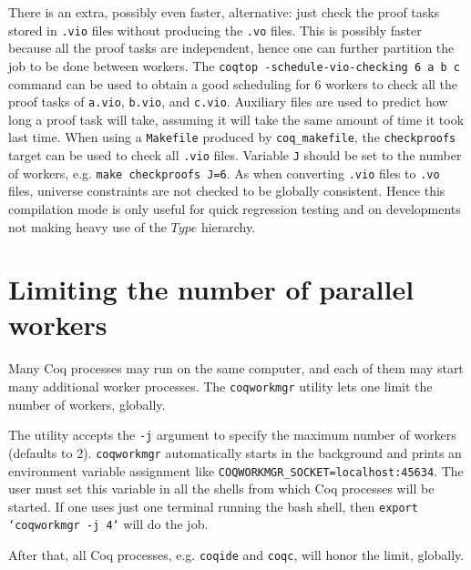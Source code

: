 There is an extra, possibly even faster, alternative: just check the
proof tasks stored in \texttt{.vio} files without producing the
\texttt{.vo} files. This is possibly faster because all the proof tasks
are independent, hence one can further partition the job to be done
between workers. The \texttt{coqtop -schedule-vio-checking 6 a b c}
command can be used to obtain a good scheduling for 6 workers to check
all the proof tasks of \texttt{a.vio}, \texttt{b.vio}, and
\texttt{c.vio}. Auxiliary files are used to predict how long a proof task
will take, assuming it will take the same amount of time it took last
time. When using a \texttt{Makefile} produced by \texttt{coq\_makefile},
the \texttt{checkproofs} target can be used to check all \texttt{.vio}
files. Variable \texttt{J} should be set to the number of workers,
e.g. \texttt{make checkproofs J=6}. As when converting \texttt{.vio}
files to \texttt{.vo} files, universe constraints are not checked to be
globally consistent. Hence this compilation mode is only useful for quick
regression testing and on developments not making heavy use of the $Type$
hierarchy.

\section{Limiting the number of parallel workers}
\label{coqworkmgr}

Many Coq processes may run on the same computer, and each of them may start
many additional worker processes. 
The \texttt{coqworkmgr} utility lets one limit the number of workers, globally.

The utility accepts the \texttt{-j} argument to specify the maximum number of
workers (defaults to 2). \texttt{coqworkmgr} automatically starts in the
background and prints an environment variable assignment like
\texttt{COQWORKMGR\_SOCKET=localhost:45634}. The user must set this variable in
all the shells from which Coq processes will be started.  If one uses just
one terminal running the bash shell, then \texttt{export `coqworkmgr -j 4`} will
do the job.

After that, all Coq processes, e.g. \texttt{coqide} and \texttt{coqc},
will honor the limit, globally.


